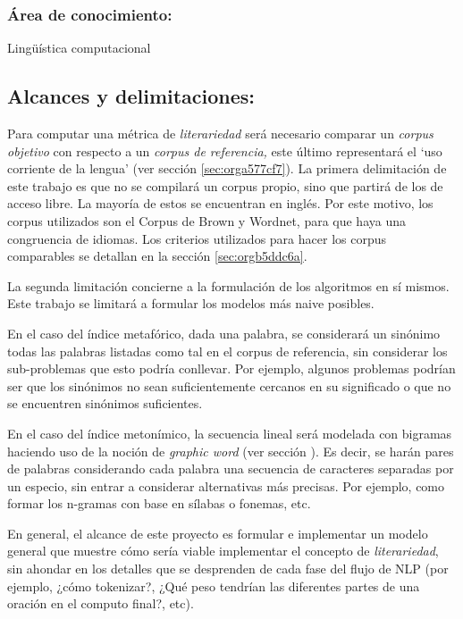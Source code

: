\documentclass[12pt,letterpaper,twoside]{article}
\begin{document}
\subsubsection{\textbf{Área de conocimiento:}}
\label{sec:orgf96648f}

Lingüística computacional

\subsection{Alcances y delimitaciones:}
\label{sec:org005cd8b}

Para computar una métrica de \emph{literariedad} será necesario comparar un
\emph{corpus objetivo} con respecto a un \emph{corpus de referencia,} este
último representará el ‘uso corriente de la lengua' (ver sección
\ref{sec:orga577cf7}). La primera delimitación de este trabajo es que no se
compilará un corpus propio, sino que partirá de los de acceso
libre. La mayoría de estos se encuentran en inglés. Por este motivo,
los corpus utilizados son el Corpus de Brown y Wordnet, para
que haya una congruencia de idiomas. Los criterios
utilizados para hacer los corpus comparables se detallan en la sección
\ref{sec:orgb5ddc6a}.

La segunda limitación concierne a la formulación de los algoritmos en
sí mismos. Este trabajo se limitará a formular los modelos más naive
posibles.

En el caso del índice metafórico, dada una palabra, se
considerará un sinónimo todas las palabras listadas como tal en el
corpus de referencia, sin considerar los sub-problemas que esto podría
conllevar. Por ejemplo, algunos problemas podrían ser que los
sinónimos no sean suficientemente cercanos en su significado o que no
se encuentren sinónimos suficientes.

En el caso del índice metonímico, la secuencia lineal será modelada
con bigramas haciendo uso de la noción de \emph{graphic word} (ver sección
).  Es decir, se harán pares de palabras considerando cada
palabra una secuencia de caracteres separadas por un especio, sin
entrar a considerar alternativas más precisas. Por ejemplo, como
formar los n-gramas con base en sílabas o fonemas, etc.

En general, el alcance de este proyecto es formular e implementar un
modelo general que muestre cómo sería viable implementar el concepto de
\emph{literariedad}, sin ahondar en los detalles que se desprenden de cada
fase del flujo de NLP (por ejemplo, ¿cómo tokenizar?, ¿Qué peso tendrían
las diferentes partes de una oración en el computo final?, etc).
\end{document}
